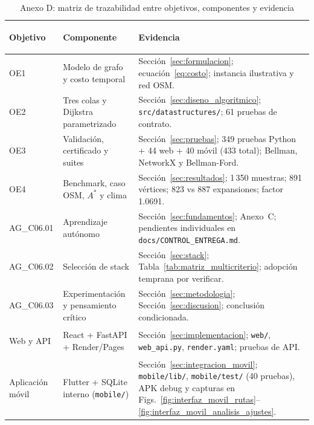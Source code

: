 \begin{table}[H]
    \centering
    \fontsize{8.8}{10.8}\selectfont
    \renewcommand{\arraystretch}{1.14}
    \caption{Anexo D: matriz de trazabilidad entre objetivos, componentes y evidencia}
    \label{tab:matriz_trazabilidad}
    \begin{tabularx}{\textwidth}{@{}>{\bfseries\raggedright\arraybackslash}p{2.6cm} >{\raggedright\arraybackslash}p{4.7cm} >{\raggedright\arraybackslash}X@{}}
        \toprule
        \textbf{Objetivo} & \textbf{Componente} & \textbf{Evidencia} \\
        \midrule
        OE1 & Modelo de grafo y costo temporal & Sección~\ref{sec:formulacion}; ecuación~\eqref{eq:costo}; instancia ilustrativa y red OSM. \\
        OE2 & Tres colas y Dijkstra parametrizado & Sección~\ref{sec:diseno_algoritmico}; \texttt{src/datastructures/}; 61 pruebas de contrato. \\
        OE3 & Validación, certificado y suites & Sección~\ref{sec:pruebas}; 349 pruebas Python + 44 web + 40 móvil (433 total); Bellman, NetworkX y Bellman-Ford. \\
        OE4 & Benchmark, caso OSM, $A^*$ y clima & Sección~\ref{sec:resultados}; 1\,350 muestras; 891 vértices; 823 vs 887 expansiones; factor 1.0691. \\
        AG\_C06.01 & Aprendizaje autónomo & Sección~\ref{sec:fundamentos}; Anexo~C; pendientes individuales en \texttt{docs/CONTROL\_ENTREGA.md}. \\
        AG\_C06.02 & Selección de stack & Sección~\ref{sec:stack}; Tabla~\ref{tab:matriz_multicriterio}; adopción temprana por verificar. \\
        AG\_C06.03 & Experimentación y pensamiento crítico & Sección~\ref{sec:metodologia}; Sección~\ref{sec:discusion}; conclusión condicionada. \\
        Web y API & React + FastAPI + Render/Pages & Sección~\ref{sec:implementacion}; \texttt{web/}, \texttt{web\_api.py}, \texttt{render.yaml}; pruebas de API. \\
        Aplicación móvil & Flutter + SQLite interno (\texttt{mobile/}) & Sección~\ref{sec:integracion_movil}; \texttt{mobile/lib/}, \texttt{mobile/test/} (40 pruebas), APK debug y capturas en Figs.~\ref{fig:interfaz_movil_rutas}--\ref{fig:interfaz_movil_analisis_ajustes}. \\
        \bottomrule
    \end{tabularx}
\end{table}

